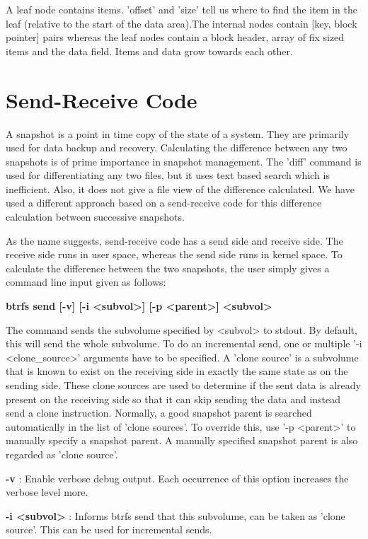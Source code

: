 \documentclass[final]{ols}
\begin{document}
A leaf node contains items. 'offset' and 'size' tell us where to find the item in the leaf (relative to the start of the data area).The internal nodes contain [key, block pointer] pairs whereas the leaf nodes contain a block header, array of fix sized items and the data field. Items and data grow towards each other.

\section{Send-Receive Code}\label{lockhart-SendReceiveCode}
A snapshot is a point in time copy of the state of a system. They are primarily used for data backup and recovery. Calculating the difference between any two snapshots is of prime importance in snapshot management. The 'diff' command is used for differentiating any two files, but it uses text based search which is inefficient. Also, it does not give a file view of the difference calculated. We have used a different approach based on a send-receive code for this difference calculation between successive snapshots.

As the name suggests, send-receive code has a send side and receive side. The receive side runs in user space, whereas the send side runs in kernel space. To calculate the difference between the two snapshots, the user simply gives a command line input given as follows:

\textbf{btrfs send [-v] [-i <subvol>] [-p <parent>] <subvol>}
       		         
The command sends the subvolume specified by <subvol> to stdout. By default, this will send the whole subvolume. To do an incremental send, one or multiple '-i <clone\_source>' arguments have to be specified. A 'clone source' is a subvolume that is known to exist on the receiving side in exactly the same state as on the sending side. These clone sources are used to determine if the sent data is already present on the receiving side so that it can skip sending the data and instead send a clone instruction. Normally, a good snapshot parent is searched automatically in the list of 'clone sources'. To override this, use '-p <parent>' to manually specify a snapshot parent. A manually specified snapshot parent is also regarded as 'clone source'.

\textbf{-v} : Enable verbose debug output. Each occurrence of this option increases the verbose level more.

\textbf{-i <subvol>} : Informs btrfs send that this subvolume, can be taken as 'clone source'. This can be used for incremental sends.
\end{document}
